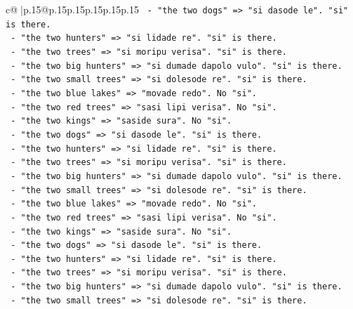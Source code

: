 \documentclass{article}
\begin{document}
{\begin{supertabular}{c@{$\;$}|p{.15\linewidth}@{}p{.15\linewidth}p{.15\linewidth}p{.15\linewidth}p{.15\linewidth}p{.15\linewidth}}
{{{\texttt{                 {-} "the two dogs" => "si dasode le". "si" is there.} \\
\texttt{                 {-} "the two hunters" => "si lidade re". "si" is there.} \\
\texttt{                 {-} "the two trees" => "si moripu verisa". "si" is there.} \\
\texttt{                 {-} "the two big hunters" => "si dumade dapolo vulo". "si" is there.} \\
\texttt{                 {-} "the two small trees" => "si dolesode re". "si" is there.} \\
\texttt{                 {-} "the two blue lakes" => "movade redo". No "si".} \\
\texttt{                 {-} "the two red trees" => "sasi lipi verisa". No "si".} \\
\texttt{                 {-} "the two kings" => "saside sura". No "si".} \\
\texttt{                 {-} "the two dogs" => "si dasode le". "si" is there.} \\
\texttt{                 {-} "the two hunters" => "si lidade re". "si" is there.} \\
\texttt{                 {-} "the two trees" => "si moripu verisa". "si" is there.} \\
\texttt{                 {-} "the two big hunters" => "si dumade dapolo vulo". "si" is there.} \\
\texttt{                 {-} "the two small trees" => "si dolesode re". "si" is there.} \\
\texttt{                 {-} "the two blue lakes" => "movade redo". No "si".} \\
\texttt{                 {-} "the two red trees" => "sasi lipi verisa". No "si".} \\
\texttt{                 {-} "the two kings" => "saside sura". No "si".} \\
\texttt{                 {-} "the two dogs" => "si dasode le". "si" is there.} \\
\texttt{                 {-} "the two hunters" => "si lidade re". "si" is there.} \\
\texttt{                 {-} "the two trees" => "si moripu verisa". "si" is there.} \\
\texttt{                 {-} "the two big hunters" => "si dumade dapolo vulo". "si" is there.} \\
\texttt{                 {-} "the two small trees" => "si dolesode re". "si" is there.} \\
}}}
\end{supertabular}}
\end{document}
